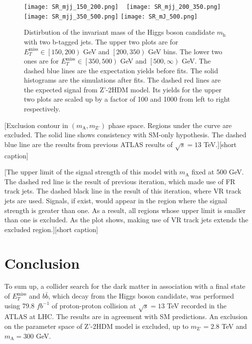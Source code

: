 \documentclass[class=NCU_thesis, crop=false]{standalone}
\begin{document}
	\begin{figure}[!hbt]
		\centering
		\subcaptionbox
		{\label{fig:subfig_SR_mjj_150_200}}
		{\texttt{[image: SR\_mjj\_150\_200.png]}}
		~
		\subcaptionbox
		{\label{fig:subfig_SR_mjj_200_350}}
		{\texttt{[image: SR\_mjj\_200\_350.png]}}
		\vspace{\baselineskip} %
		\subcaptionbox
		{\label{fig:subfig_SR_mjj_350_500}}
		{\texttt{[image: SR\_mjj\_350\_500.png]}}
		\subcaptionbox
		{\label{fig:subfig_SR_mJ_500}}
		{\texttt{[image: SR\_mJ\_500.png]}}
		\caption{Distirbution of the invariant mass of the Higgs boson candidate $m_{\mathrm{h}}$ with two b-tagged jets. The upper two plots are for $E_T^{\mathrm{miss}} \in \left[150, 200\right)$ GeV and $\left[200, 350\right)$ GeV bins. The lower two ones are for $E_T^{\mathrm{miss}} \in \left[350, 500\right)$ GeV and $\left[500, \infty \right)$ GeV. The dashed blue lines are the expectation yields before fits. The solid histograms are the simulations after fits. The dashed red lines are the expected signal from Z'-2HDM model. Its yields for the upper two plots are scaled up by a factor of 100 and 1000 from left to right respectively.}
		\label{fig:SR_mj}
	\end{figure}
	
	[Exclusion contour in $(m_{\mathrm{A}}, m_{\mathrm{Z'}})$ phase space. Regions under the curve are excluded. The solid line shows consistency with SM-only hypothesis. The dashed blue line are the results from previous ATLAS results of $\sqrt{s} = 13$ TeV.][short caption]
	
	[The upper limit of the signal strength of this model with $m_{\mathrm{A}}$ fixed at 500 GeV. The dashed red line is the result of previous iteration, which made use of FR track jets. The dashed black line in the result of this iteration, where VR track jets are used. Signals, if exist, would appear in the region where the signal strength is greater than one. As a result, all regions whose upper limit is smaller than one is excluded. As the plot shows, making use of VR track jets extends the excluded region.][short caption]


\chapter{Conclusion}\label{result}
	To sum up, a collider search for the dark matter in association with a final state of $E_T^{\mathrm{miss}}$ and $b\bar{b}$, which decay from the Higgs boson candidate, was performed using 79.8 $fb^{-1}$ of proton-proton collision at $\sqrt{s} = 13$ TeV recorded in the ATLAS at LHC. The results are in agreement with SM predictions. An exclusion on the parameter space of Z'-2HDM model is excluded, up to $m_{\mathrm{Z'}} = 2.8$ TeV and $m_{\mathrm{A}} = 300$ GeV.
\end{document}

